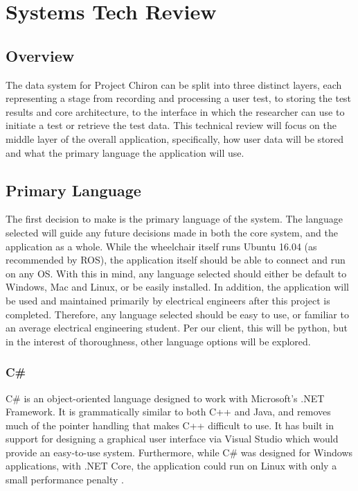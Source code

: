\documentclass[onecolumn, draftclsnofoot,10pt, compsoc]{report}
\begin{document}
\chapter{Systems Tech Review}
\minitoc
\section{Overview}

The data system for Project Chiron can be split into three distinct layers, each representing a stage from recording and processing a user test, to storing the test results and core architecture, to the interface in which the researcher can use to initiate a test or retrieve the test data. This technical review will focus on the middle layer of the overall application, specifically, how user data will be stored and what the primary language the application will use.


\section{Primary Language}
The first decision to make is the primary language of the system. The language selected will guide any future decisions made in both the core system, and the application as a whole. While the wheelchair itself runs Ubuntu 16.04 (as recommended by ROS\cite{ROSKenetic}), the application itself should be able to connect and run on any OS. With this in mind, any language selected should either be default to Windows, Mac and Linux, or be easily installed. In addition, the application will be used and maintained primarily by electrical engineers after this project is completed. Therefore, any language selected should be easy to use, or familiar to an average electrical engineering student. Per our client, this will be python, but in the interest of thoroughness, other language options will be explored.
\subsection{C\#}
C\# is an object-oriented language designed to work with Microsoft's .NET Framework. It is grammatically similar to both C++ and Java, and removes much of the pointer handling that makes C++ difficult to use\cite{MicrosoftCSharp}. It has built in support for designing a graphical user interface via Visual Studio \cite{CSharpGraphics} which would provide an easy-to-use system. Furthermore, while C\# was designed for Windows applications, with .NET Core, the application could run on Linux with only a small performance penalty \cite{CSharpLinux}. 
\end{document}
